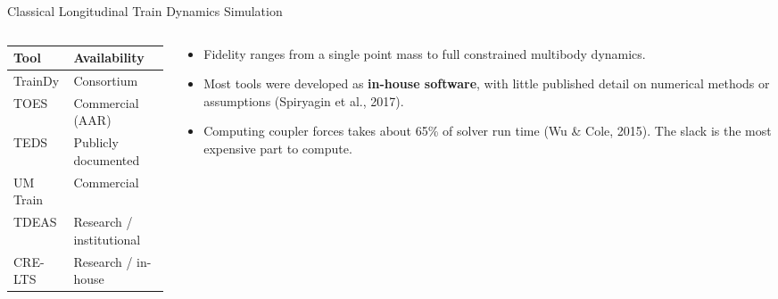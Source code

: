\begin{frame}{Classical Longitudinal Train Dynamics Simulation}
  \vspace{0.2em}
  \begin{columns}[T,onlytextwidth]
    \begin{column}{0.52\textwidth}
      {\footnotesize
      \begin{tabular}{@{}L{1.9cm}L{3.3cm}@{}}
        \toprule
        \textbf{Tool} & \textbf{Availability} \\
        \midrule
        TrainDy   & Consortium \\
        TOES      & Commercial (AAR) \\
        TEDS      & Publicly documented \\
        UM Train  & Commercial \\
        TDEAS     & Research / institutional \\
        CRE-LTS   & Research / in-house \\
        \bottomrule
      \end{tabular}}

      \vspace{0.7em}
    \end{column}
    \begin{column}{0.44\textwidth}
      \begin{itemize}\setlength\itemsep{0.55em}
        \item Fidelity ranges from a single point mass to full constrained
              multibody dynamics.
        \item Most tools were developed as \textbf{in-house software}, with
              little published detail on numerical methods or assumptions
              {\scriptsize (Spiryagin et al., 2017)}.
        \item Computing coupler forces takes about \alert{65\% of solver
              run time} {\scriptsize (Wu \& Cole, 2015)}. The slack is the most
              expensive part to compute.
      \end{itemize}
    \end{column}
  \end{columns}
\end{frame}

